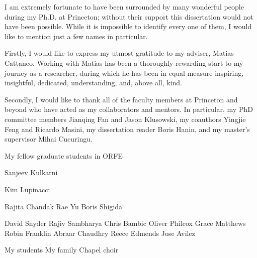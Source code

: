 
I am extremely fortunate to have been surrounded by many wonderful people during
my Ph.D. at Princeton; without their support this dissertation
would not have been possible. While it is impossible to identify every one of them,
I would like to mention just a few names in particular.

Firstly, I would like to express my utmost gratitude to my adviser,
Matias Cattaneo. Working with Matias has been a thoroughly rewarding start to my
journey as a researcher, during which he has been in equal measure inspiring,
insightful, dedicated, understanding, and, above all, kind.

Secondly, I would like to thank all of the faculty members at
Princeton and beyond who have acted as my collaborators and mentors.
In particular, my PhD committee members
Jianqing Fan and Jason Klusowski,
my coauthors Yingjie Feng and Ricardo Masini,
my dissertation reader Boris Hanin,
and my master's supervisor Mihai Cucuringu.

My fellow graduate students in ORFE

Sanjeev Kulkarni

Kim Lupinacci

Rajita Chandak
Rae Yu
Boris Shigida

David Snyder
Rajiv Sambharya
Chris Bambic
Oliver Philcox
Grace Matthews
Robin Franklin
Abraar Chaudhry
Reece Edmends
Jose Avilez

My students
My family
Chapel choir
